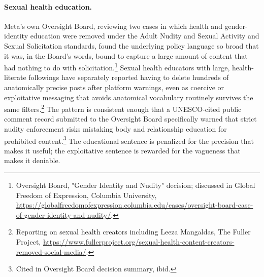\documentclass[11pt]{article}
\begin{document}
\paragraph{Sexual health education.} Meta's own Oversight Board, reviewing two cases in which health and gender-identity education were removed under the Adult Nudity and Sexual Activity and Sexual Solicitation standards, found the underlying policy language so broad that it was, in the Board's words, bound to capture a large amount of content that had nothing to do with solicitation.\footnote{Oversight Board, "Gender Identity and Nudity" decision; discussed in Global Freedom of Expression, Columbia University, \url{https://globalfreedomofexpression.columbia.edu/cases/oversight-board-case-of-gender-identity-and-nudity/}.} Sexual health educators with large, health-literate followings have separately reported having to delete hundreds of anatomically precise posts after platform warnings, even as coercive or exploitative messaging that avoids anatomical vocabulary routinely survives the same filters.\footnote{Reporting on sexual health creators including Leeza Mangaldas, The Fuller Project, \url{https://www.fullerproject.org/sexual-health-content-creators-removed-social-media/}.} The pattern is consistent enough that a UNESCO-cited public comment record submitted to the Oversight Board specifically warned that strict nudity enforcement risks mistaking body and relationship education for prohibited content.\footnote{Cited in Oversight Board decision summary, ibid.} The educational sentence is penalized for the precision that makes it useful; the exploitative sentence is rewarded for the vagueness that makes it deniable.
\end{document}
